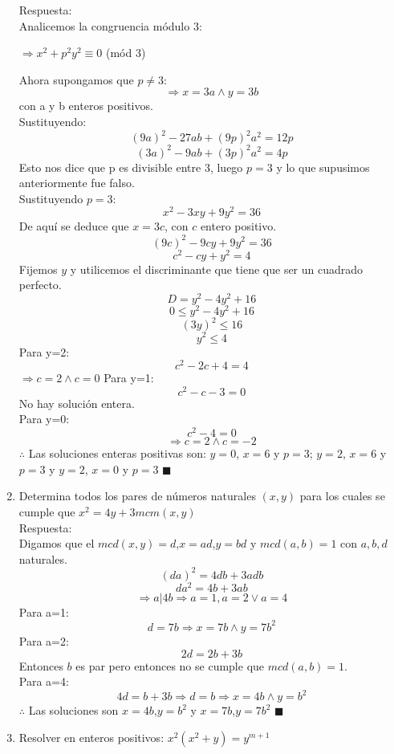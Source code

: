 \documentclass{book}
\begin{document}
\begin{enumerate}
          Respuesta:\\
          Analicemos la congruencia módulo 3:
          \begin{center}
              $\Rightarrow x^2+p^2 y^2\equiv 0$ (mód 3)
          \end{center}
          Ahora supongamos que $p\neq3$:
          $$\Rightarrow x=3a \wedge y=3b$$
          con a y b enteros positivos. \\
          Sustituyendo:
          $${(9a)}^2-27ab+{(9p)}^2 a^2=12p$$
          $${(3a)}^2-9ab+{(3p)}^2 a^2=4p$$
          Esto nos dice que p es divisible entre 3, luego $p=3$ y lo que supusimos anteriormente fue falso.\\
          Sustituyendo $p=3$:
          $$x^2-3xy+9y^2=36$$
          De aquí se deduce que $x=3c$, con $c$ entero positivo.
          $${(9c)}^2-9cy+9y^2=36$$
          $$c^2-cy+y^2=4$$
          Fijemos $y$ y utilicemos el discriminante que tiene que ser un cuadrado perfecto.
          $$D=y^2-4y^2+16$$
          $$0\leq y^2-4y^2+16$$
          $${(3y)}^2\leq 16$$
          $$y^2\leq 4$$
          Para y=2:
          $$c^2-2c+4=4$$
          $\Rightarrow c=2 \wedge c=0$
          Para y=1:
          $$c^2-c-3=0$$
          No hay solución entera.\\
          Para y=0:
          $$c^2-4=0$$
          $$\Rightarrow c=2 \wedge c=-2$$
          $\therefore$ Las soluciones enteras positivas son: $y=0$, $x=6$ y $p=3$; $y=2$, $x=6$ y $p=3$ y $y=2$, $x=0$ y $p=3$ $\blacksquare$\\
    \item Determina todos los pares de números naturales $(x,y)$ para los cuales se cumple que $x^2=4y+3mcm(x,y)$\\
          Respuesta:\\
          Digamos que el $mcd(x,y)=d$,$x=ad$,$y=bd$ y $mcd(a,b)=1$ con $a,b,d$ naturales.
          $${(da)}^2  = 4db +3adb$$
          $$da^2  = 4b +3ab$$
          $$\Rightarrow a|4b \Rightarrow a=1,a=2 \vee a=4$$
          Para a=1:
          $$d = 7b\Rightarrow x=7b \wedge y=7b^2$$
          Para a=2:
          $$2d = 2b +3b$$
          Entonces $b$ es par pero entonces no se cumple que $mcd(a,b)=1$.\\
          Para a=4:
          $$4d =b+3b\Rightarrow d=b\Rightarrow x=4b \wedge y=b^2$$
          $\therefore$ Las soluciones son $x=4b$,$y=b^2$ y $x=7b$,$y=7b^2$ $\blacksquare$\\
    \item Resolver en enteros positivos: $x^2(x^2+y)=y^{m+1}$\\

\end{enumerate}
\end{document}
